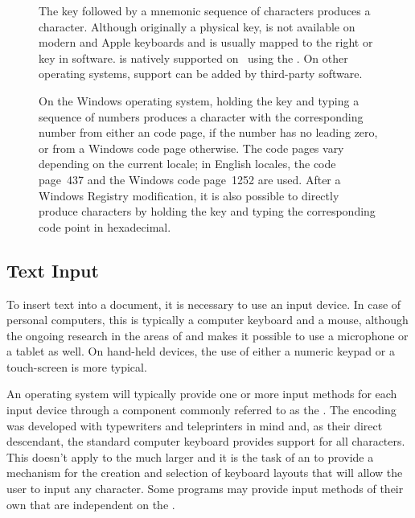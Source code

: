 \begin{figure}[p]
  
  \caption{The  key
    followed by a mnemonic sequence of  characters produces a
     character. Although originally a physical key, 
    is not available on modern  and Apple keyboards and is usually
    mapped to the right  or  key in software.
     is natively supported on \Unices\ using the . On other operating systems, support can be added by third-party
    software.}
\end{figure}

\begin{figure}
  
  \caption{On the Windows operating system, holding the  key and typing
    a sequence of numbers produces a character with the corresponding number
    from either an  code page, if the number has no leading zero,
    or from a Windows code page otherwise. The code pages vary depending on the
    current locale; in English locales, the  code page~437
    and the Windows code page~1252 are used. After a Windows Registry
    modification, it is also possible to directly produce 
    characters by holding the  key and typing the corresponding
     code point in hexadecimal.}
\end{figure}

\subsection{Text Input}
To insert text into a document, it is necessary to use an input device. In case
of personal computers, this is typically a computer keyboard and a mouse,
although the ongoing research in the areas of  and 
makes it possible to use a microphone or a tablet as well. On hand-held devices,
the use of either a numeric keypad or a touch-screen is more typical.

An operating system will typically provide one or more input methods for each
input device through a component commonly referred to as the . The
 encoding was developed with typewriters and teleprinters in
mind and, as their direct descendant, the standard computer keyboard provides
support for all  characters. This doesn't apply to the much
larger  and it is the task of an  to provide a
mechanism for the creation and selection of keyboard layouts that will allow the
user to input any  character. Some programs may provide input
methods of their own that are independent on the .

